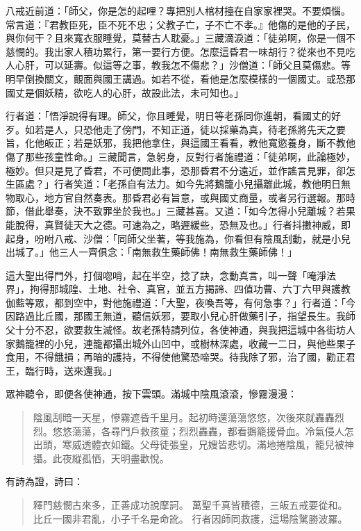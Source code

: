 八戒近前道：「師父，你是怎的起哩？專把別人棺材擡在自家家裡哭。不要煩惱。常言道：『君教臣死，臣不死不忠；父教子亡，子不亡不孝。』他傷的是他的子民，與你何干？且來寬衣服睡覺，莫替古人耽憂。」三藏滴淚道：「徒弟啊，你是一個不慈憫的。我出家人積功累行，第一要行方便。怎麼這昏君一味胡行？從來也不見吃人心肝，可以延壽。似這等之事，教我怎不傷悲？」沙僧道：「師父且莫傷悲。等明早倒換關文，覿面與國王講過。如若不從，看他是怎麼模樣的一個國丈。或恐那國丈是個妖精，欲吃人的心肝，故設此法，未可知也。」

行者道：「悟淨說得有理。師父，你且睡覺，明日等老孫同你進朝，看國丈的好歹。如若是人，只恐他走了傍門，不知正道，徒以採藥為真，待老孫將先天之要旨，化他皈正；若是妖邪，我把他拿住，與這國王看看，教他寬慾養身，斷不教他傷了那些孩童性命。」三藏聞言，急躬身，反對行者施禮道：「徒弟啊，此論極妙，極妙。但只是見了昏君，不可便問此事，恐那昏君不分遠近，並作謠言見罪，卻怎生區處？」行者笑道：「老孫自有法力。如今先將鵝籠小兒攝離此城，教他明日無物取心，地方官自然奏表。那昏君必有旨意，或與國丈商量，或者另行選報。那時節，借此舉奏，決不致罪坐於我也。」三藏甚喜。又道：「如今怎得小兒離城？若果能脫得，真賢徒天大之德。可速為之，略遲緩些，恐無及也。」行者抖擻神威，即起身，吩咐八戒、沙僧：「同師父坐著，等我施為，你看但有陰風刮動，就是小兒出城了。」他三人一齊俱念：「南無救生藥師佛！南無救生藥師佛！」

這大聖出得門外，打個唿哨，起在半空，捻了訣，念動真言，叫一聲「唵淨法界」，拘得那城隍、土地、社令、真官，並五方揭諦、四值功曹、六丁六甲與護教伽藍等眾，都到空中，對他施禮道：「大聖，夜喚吾等，有何急事？」行者道：「今因路過比丘國，那國王無道，聽信妖邪，要取小兒心肝做藥引子，指望長生。我師父十分不忍，欲要救生滅怪。故老孫特請列位，各使神通，與我把這城中各街坊人家鵝籠裡的小兒，連籠都攝出城外山凹中，或樹林深處，收藏一二日，與他些果子食用，不得餓損；再暗的護持，不得使他驚恐啼哭。待我除了邪，治了國，勸正君王，臨行時，送來還我。」

眾神聽令，即便各使神通，按下雲頭。滿城中陰風滾滾，慘霧漫漫：
\begin{quote}
陰風刮暗一天星，慘霧遮昏千里月。起初時還蕩蕩悠悠，次後來就轟轟烈烈。悠悠蕩蕩，各尋門戶救孩童；烈烈轟轟，都看鵝籠援骨血。冷氣侵人怎出頭，寒威透體衣如鐵。父母徒張皇，兄嫂皆悲切。滿地捲陰風，籠兒被神攝。此夜縱孤恓，天明盡歡悅。
\end{quote}

有詩為證，詩曰：
\begin{quote}
釋門慈憫古來多，正善成功說摩訶。
萬聖千真皆積德，三皈五戒要從和。
比丘一國非君亂，小子千名是命訛。
行者因師同救護，這場陰騭勝波羅。
\end{quote}

